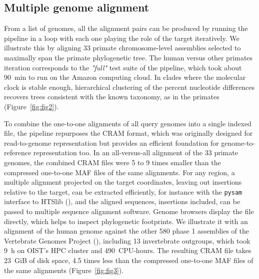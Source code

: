 \documentclass[PCJ,Unicode,screen]{cedram}
\begin{document}
\subsection*{Multiple genome alignment}

From a list of genomes, all the alignment pairs can be produced by running the pipeline in a loop with each one playing the role of the target iteratively. We illustrate this by aligning 33 primate chromosome-level assemblies selected to maximally span the primate phylogenetic tree. The human versus other primates iteration corresponds to the \emph{"full"} test suite of the pipeline, which took about 90~min to run on the Amazon computing cloud. In clades where the molecular clock is stable enough, hierarchical clustering of the percent nucleotide differences recovers trees consistent with the known taxonomy, as in the primates (Figure~\ref{fig:fig2}).

To combine the one-to-one alignments of all query genomes into a single indexed file, the pipeline repurposes the CRAM format, which was originally designed for read-to-genome representation but provides an efficient foundation for genome-to-reference representation too. In an all-versus-all alignment of the 33 primate genomes, the combined CRAM files were 5 to 9 times smaller than the compressed one-to-one MAF files of the same alignments. For any region, a multiple alignment projected on the target coordinates, leaving out insertions relative to the target, can be extracted efficiently, for instance with the \verb|pysam| interface to HTSlib (\cite{Heger_2009}), and the aligned sequences, insertions included, can be passed to multiple sequence alignment software. Genome browsers display the file directly, which helps to inspect phylogenetic footprints. We illustrate it with an alignment of the human genome against the other 580 phase 1 assemblies of the Vertebrate Genomes Project (\cite{Formenti_2026}), including 13 invertebrate outgroups, which took 9~h on OIST's HPC cluster and 490~CPU-hours. The resulting CRAM file takes 23~GiB of disk space, 4.5 times less than the compressed one-to-one MAF files of the same alignments (Figure~\ref{fig:fig3}).
\end{document}
